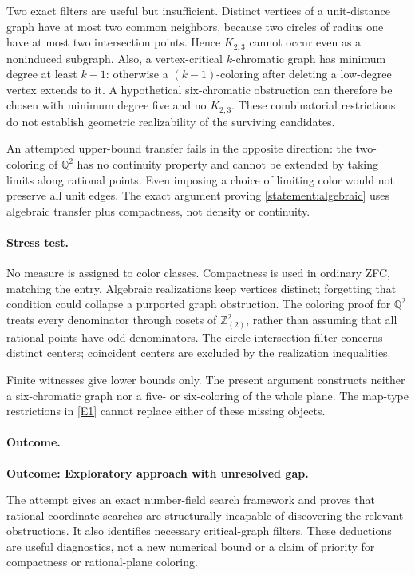 \documentclass[11pt,a4paper]{article}
\newcommand{\Z}{\mathbb{Z}}
\newcommand{\Q}{\mathbb{Q}}
\newcommand{\eref}[2]{\hyperlink{extra:#1:#2}{[E#2]}}
\numberwithin{equation}{section}
\begin{document}
Two exact filters are useful but insufficient. Distinct vertices of a
unit-distance graph have at most two common neighbors, because two
circles of radius one have at most two intersection points. Hence $K_{2,3}$
cannot occur even as a noninduced subgraph. Also, a vertex-critical
$k$-chromatic graph has minimum degree at least $k-1$: otherwise a
$(k-1)$-coloring after deleting a low-degree vertex extends to it.
A hypothetical six-chromatic obstruction can therefore be chosen with
minimum degree five and no $K_{2,3}$. These combinatorial restrictions do
not establish geometric realizability of the surviving candidates.

An attempted upper-bound transfer fails in the opposite direction:
the two-coloring of $\Q^2$ has no continuity property and cannot be
extended by taking limits along rational points. Even imposing a
choice of limiting color would not preserve all unit edges. The exact
argument proving \eqref{statement:algebraic} uses algebraic transfer plus
compactness, not density or continuity.

\paragraph{Stress test.}
No measure is assigned to color classes. Compactness is used in ordinary
ZFC, matching the entry. Algebraic realizations keep vertices distinct;
forgetting that condition could collapse a purported graph obstruction.
The coloring proof for $\Q^2$ treats every denominator through cosets of
$\Z_{(2)}^2$, rather than assuming that all rational points have odd
denominators. The circle-intersection filter concerns distinct centers;
coincident centers are excluded by the realization inequalities.

Finite witnesses give lower bounds only. The present argument constructs
neither a six-chromatic graph nor a five- or six-coloring of the whole
plane. The map-type restrictions in \eref{statement}{1} cannot replace either
of these missing objects.

\paragraph{Outcome.}
\textbf{Outcome: Exploratory approach with unresolved gap.}

The attempt gives an exact number-field search framework and proves that
rational-coordinate searches are structurally incapable of discovering
the relevant obstructions. It also identifies necessary critical-graph
filters. These deductions are useful diagnostics, not a new numerical
bound or a claim of priority for compactness or rational-plane coloring.
\end{document}
